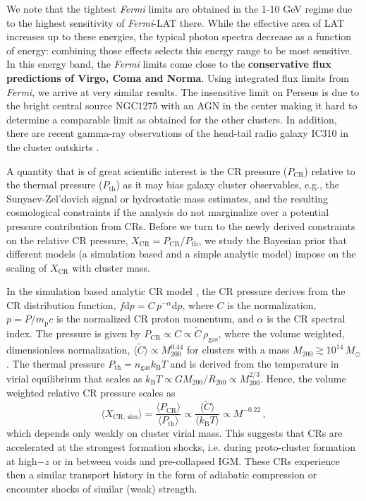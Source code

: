 \documentclass[10pt,aps,pra,reprint,amsmath,amsfonts,amssymb,showpacs,nofootinbib,floatfix]{revtex4-1}
\def\del#1{{}}
\def\C#1{{\bf #1}}
\newcommand{\Fermi}{{\em Fermi}\xspace}
\newcommand{\rmn}{\mathrm}
\newcommand{\msun}{M_\odot}
\newcommand{\B}{\rmn{B}}
\newcommand{\bra}{\langle}
\newcommand{\ket}{\rangle}
\newcommand{\dd}{\rmn{d}}
\newcommand{\CR}{\rmn{CR}}
\newcommand{\mvir}{M_{200}}
\begin{document}
We note that the tightest \Fermi limits are obtained in the 1-10 GeV
regime due to the highest sensitivity of \Fermi-LAT there. While the
effective area of LAT increases up to these energies, the typical
photon spectra decrease as a function of energy: combining those
effects selects this energy range to be most sensitive.  In this
energy band, the \Fermi limits come close to the \C{conservative flux
  predictions of Virgo, Coma and Norma}. Using integrated flux limits
  from \Fermi, we arrive at very similar results.  \del{We emphasize that
  by using our analytic modeling, the slight discrepancy of the
  scaling relation-based prediction with the \Fermi limit on Norma
  \cite{2010ApJ...717L..71A} is resolved: Norma simply seems to be
  less bright than an average cluster of the same mass as Norma.} The
  insensitive limit on Perseus is due to the bright central source
  NGC1275 with an AGN in the center \cite{2010ATel.2916....1M} making
  it hard to determine a comparable limit as obtained for the other
  clusters. In addition, there are recent gamma-ray observations of
  the head-tail radio galaxy IC310 in the cluster outskirts
  \cite{2010ApJ...723L.207A,2010A&A...519L...6N}.

A quantity that is of great scientific interest is the CR pressure
($P_\CR$) relative to the thermal pressure ($P_\rmn{th}$) as it may
bias galaxy cluster observables, e.g., the Sunyaev-Zel’dovich signal
or hydrostatic mass estimates, and the resulting cosmological
constraints if the analysis do not marginalize over a potential
pressure contribution from CRs. Before we turn to the newly derived
constraints on the relative CR pressure, $X_\CR = P_\CR/P_\rmn{th}$,
we study the Bayesian prior that different models (a simulation based
and a simple analytic model) impose on the scaling of $X_\CR$ with
cluster mass.

In the simulation based analytic CR model \cite{2010MNRAS.409..449P},
the CR pressure derives from the CR distribution function, $f\dd p =
C\,p^{-\alpha}\dd p$, where $C$ is the normalization, $p=P/m_\rmn{p}
c$ is the normalized CR proton momentum, and $\alpha$ is the CR
spectral index. The pressure is given by $P_\CR \propto C\propto
\tilde{C} \,\rho_\rmn{gas}$, where the volume weighted, dimensionless
normalization, $\bra\tilde{C}\ket\propto \mvir^{0.44}$ for clusters
with a mass $\mvir\gtrsim 10^{14}\,\msun$
\cite{2010MNRAS.409..449P}. The thermal pressure $P_\rmn{th} =
n_\rmn{gas} k_\B T$ and is derived from the temperature in virial
equilibrium that scales as $k_\B T \propto G \mvir/R_{200} \propto
\mvir^{2/3}$. Hence, the volume weighted relative CR pressure scales
as
\begin{equation}
    \bra X_{\CR,\,\rmn{sim}}\ket = \frac{\bra P_\CR\ket}{\bra
      P_\rmn{th}\ket} \propto \frac{\bra\tilde{C}\ket}{\bra k_\B
      T\ket} \propto M^{-0.22}\,,
\end{equation}
which depends only weakly on cluster virial mass. This suggests that
CRs are accelerated at the strongest formation shocks, i.e. during
proto-cluster formation at high$-z$ or in between voids and
pre-collapsed IGM. These CRs experience then a similar transport
history in the form of adiabatic compression or encounter shocks of
similar (weak) strength.
\end{document}
